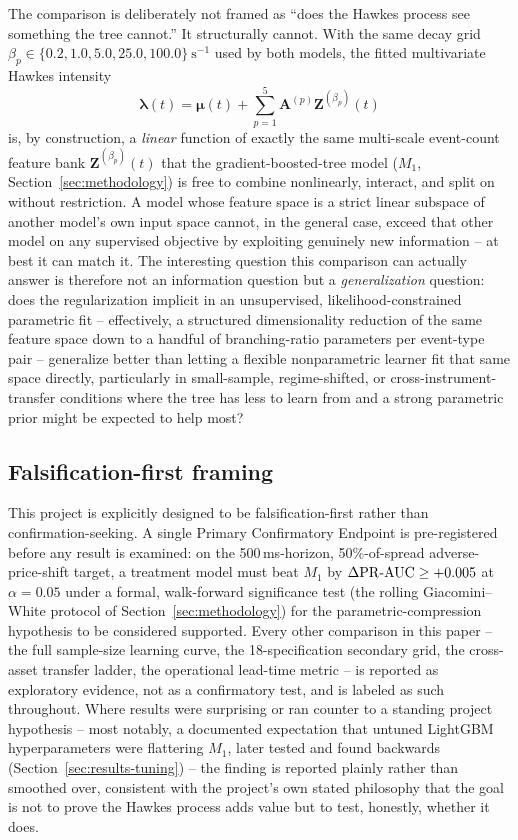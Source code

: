 The comparison is deliberately not framed as ``does the Hawkes process see
something the tree cannot.'' It structurally cannot. With the same decay
grid $\beta_p \in \{0.2, 1.0, 5.0, 25.0, 100.0\}\ \mathrm{s}^{-1}$ used by
both models, the fitted multivariate Hawkes intensity
\[
  \boldsymbol{\lambda}(t) = \boldsymbol{\mu}(t) + \sum_{p=1}^{5} \mathbf{A}^{(p)} \mathbf{Z}^{(\beta_p)}(t)
\]
is, by construction, a \emph{linear} function of exactly the same
multi-scale event-count feature bank $\mathbf{Z}^{(\beta_p)}(t)$ that the
gradient-boosted-tree model ($M_1$, Section~\ref{sec:methodology}) is free
to combine nonlinearly, interact, and split on without restriction. A
model whose feature space is a strict linear subspace of another model's
own input space cannot, in the general case, exceed that other model on
any supervised objective by exploiting genuinely new information -- at
best it can match it. The interesting question this comparison can
actually answer is therefore not an information question but a
\emph{generalization} question: does the regularization implicit in an
unsupervised, likelihood-constrained parametric fit -- effectively, a
structured dimensionality reduction of the same feature space down to a
handful of branching-ratio parameters per event-type pair -- generalize
better than letting a flexible nonparametric learner fit that same space
directly, particularly in small-sample, regime-shifted, or
cross-instrument-transfer conditions where the tree has less to learn
from and a strong parametric prior might be expected to help most?

\subsection{Falsification-first framing}
\label{sec:intro-falsification}

This project is explicitly designed to be falsification-first rather than
confirmation-seeking. A single Primary Confirmatory Endpoint is
pre-registered before any result is examined: on the 500\,ms-horizon,
50\%-of-spread adverse-price-shift target, a treatment model must beat
$M_1$ by $\Delta\mathrm{PR\text{-}AUC} \ge +0.005$ at $\alpha = 0.05$ under a formal,
walk-forward significance test (the rolling Giacomini--White protocol of
Section~\ref{sec:methodology}) for the parametric-compression hypothesis
to be considered supported. Every other comparison in this paper --
the full sample-size learning curve, the 18-specification secondary grid,
the cross-asset transfer ladder, the operational lead-time metric -- is
reported as exploratory evidence, not as a confirmatory test, and is
labeled as such throughout. Where results were surprising or ran counter
to a standing project hypothesis -- most notably, a documented
expectation that untuned LightGBM hyperparameters were flattering $M_1$,
later tested and found backwards (Section~\ref{sec:results-tuning}) -- the
finding is reported plainly rather than smoothed over, consistent with
the project's own stated philosophy that the goal is not to prove the
Hawkes process adds value but to test, honestly, whether it does.

